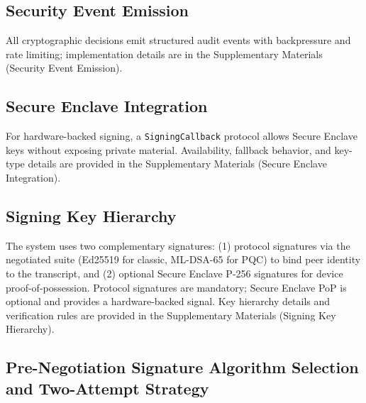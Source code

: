 \documentclass[10pt,journal,compsoc]{IEEEtran}
\begin{document}
\subsection{Security Event
Emission}\label{d.-security-event-emission}

All cryptographic decisions emit structured audit events with
backpressure and rate limiting; implementation details are in the
Supplementary Materials (Security Event Emission).

\subsection{Secure Enclave
Integration}\label{e.-secure-enclave-integration}

For hardware-backed signing, a \texttt{SigningCallback} protocol allows
Secure Enclave keys without exposing private material. Availability,
fallback behavior, and key-type details are provided in the
Supplementary Materials (Secure Enclave Integration).

\subsection{Signing Key Hierarchy}\label{f.-signing-key-hierarchy}

The system uses two complementary signatures: (1) protocol signatures
via the negotiated suite (Ed25519 for classic, ML-DSA-65 for PQC) to bind
peer identity to the transcript, and (2) optional Secure Enclave
P-256 signatures for device proof-of-possession. Protocol signatures are
mandatory; Secure Enclave PoP is optional and provides a hardware-backed
signal. Key hierarchy details and verification rules are provided in the
Supplementary Materials (Signing Key Hierarchy).

\subsection{Pre-Negotiation Signature Algorithm Selection and
Two-Attempt
Strategy}\label{g.-pre-negotiation-signature-algorithm-selection-and-two-attempt-strategy}
\end{document}
